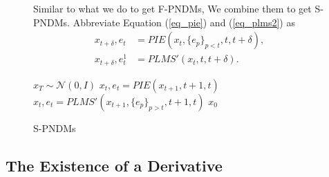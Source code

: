 \documentclass{article}
\begin{document}
\begin{figure}[h]
   \begin{minipage}[t]{0.52\linewidth}
      Similar to what we do to get F-PNDMs, We combine them to get S-PNDMs. Abbreviate Equation (\ref{eq_pie}) and (\ref{eq_plms2}) as 
      \begin{equation*}
         \begin{split}
            x_{t+\delta}, e_t &= PIE(x_t, \{e_p\}_{p<t}, t, t+\delta), \\
            x_{t+\delta}, e_t^1 &= PLMS'(x_t, t, t+\delta).
         \end{split}
      \end{equation*}
   \end{minipage}
   \vspace*{-\baselineskip}
   \quad
   \begin{minipage}[t]{0.45\linewidth}
      \vspace*{-0.7cm}
      \begin{algorithm}[H]
         \small
         \caption{S-PNDMs}
         \begin{algorithmic}[1]
            \STATE $x_T \sim \mathcal{N}(0, I)$
               \STATE $x_t, e_t = PIE(x_{t+1}, t+1, t)$ \\
            \ENDFOR
               \STATE $x_t, e_t = PLMS'(x_{t+1}, \{e_p\}_{p>t}, t+1, t)$
            \ENDFOR
            \RETURN $x_0$
         \end{algorithmic}
      \end{algorithm}
   \end{minipage}
\end{figure}



\subsection{The Existence of a Derivative}
\label{existence of derivative}
\end{document}

